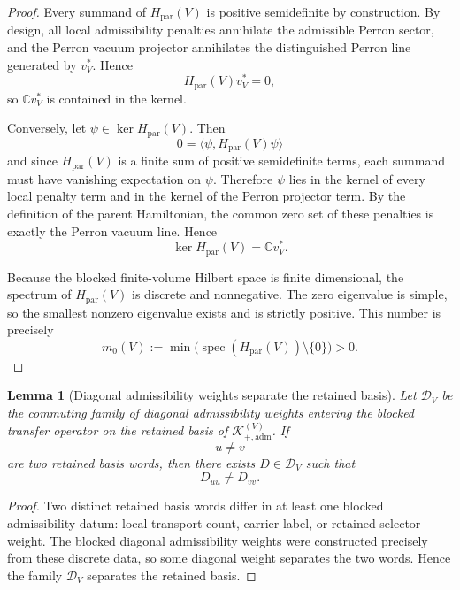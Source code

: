\documentclass[11pt,a4paper]{article}
\newtheorem{lemma}[theorem]{Lemma}
\theoremstyle{definition}
\theoremstyle{remark}
\begin{document}
\begin{proof}
Every summand of $H_{\mathrm{par}}(V)$ is positive semidefinite by construction. By design, all
local admissibility penalties annihilate the admissible Perron sector, and the Perron vacuum
projector annihilates the distinguished Perron line generated by $v_V^*$. Hence
\[
H_{\mathrm{par}}(V)v_V^*=0,
\]
so $\mathbb C v_V^*$ is contained in the kernel.

Conversely, let $\psi\in\ker H_{\mathrm{par}}(V)$. Then
\[
0=\langle \psi,H_{\mathrm{par}}(V)\psi\rangle
\]
and since $H_{\mathrm{par}}(V)$ is a finite sum of positive semidefinite terms, each summand must
have vanishing expectation on $\psi$. Therefore $\psi$ lies in the kernel of every local penalty
term and in the kernel of the Perron projector term. By the definition of the parent Hamiltonian,
the common zero set of these penalties is exactly the Perron vacuum line. Hence
\[
\ker H_{\mathrm{par}}(V)=\mathbb C v_V^*.
\]

Because the blocked finite-volume Hilbert space is finite dimensional, the spectrum of
$H_{\mathrm{par}}(V)$ is discrete and nonnegative. The zero eigenvalue is simple, so the smallest
nonzero eigenvalue exists and is strictly positive. This number is precisely
\[
m_0(V):=\min\bigl(\operatorname{spec}(H_{\mathrm{par}}(V))\setminus\{0\}\bigr)>0.
\]
\end{proof}

\begin{lemma}[Diagonal admissibility weights separate the retained basis]
\label{lem:diagonal-weights-separate-basis}
Let $\mathcal D_V$ be the commuting family of diagonal admissibility weights entering the blocked
transfer operator on the retained basis of $\mathcal K_{+,\mathrm{adm}}^{(V)}$. If
\[
u\neq v
\]
are two retained basis words, then there exists $D\in\mathcal D_V$ such that
\[
D_{uu}\neq D_{vv}.
\]
\end{lemma}

\begin{proof}
Two distinct retained basis words differ in at least one blocked admissibility datum: local
transport count, carrier label, or retained selector weight. The blocked diagonal admissibility
weights were constructed precisely from these discrete data, so some diagonal weight separates the
two words. Hence the family $\mathcal D_V$ separates the retained basis.
\end{proof}
\end{document}
